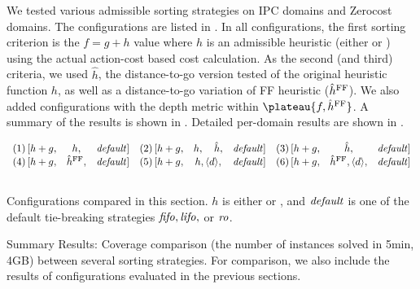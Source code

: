 We tested various admissible sorting strategies on IPC domains and Zerocost domains.
The configurations are listed in . 
In all configurations, the first sorting criterion is the $f=g+h$ value
where $h$ is an admissible heuristic (either \lmcut or \mands) using the actual action-cost based  cost calculation.
As the second (and third) criteria,
we used $\hat{h}$, the distance-to-go version tested  of the original heuristic function $h$, as well as a distance-to-go variation of FF
heuristic ($\hat{h}^{\ff}$).
We also added configurations with the depth metric within
$\plateau{f,\hat{h}^{\text{\ff}}}$.
A summary of the results is shown in .
Detailed per-domain results are shown in .

\begin{table}[htbp]
 \centering
 \[
 \begin{array}{lcllcllcl}
  (1)\, [h+g, & h,                      &\mit{default}] & %
  (2)\, [h+g, & h,     \quad   \hat{h}, &\mit{default}] & %
  (3)\, [h+g, & \hat{h},                &\mit{default}]     \\\relax
  (4)\, [h+g, & \hat{h}^{\ff},          &\mit{default}] & %
  (5)\, [h+g,   & h, \depth,                   &\mit{default}] & %
  (6)\, [h+g,   & \hat{h}^{\text{FF}}, \depth, &\mit{default}]     \\\relax
 \end{array}
 \]
 \vspace{-3em}
 \caption{Configurations compared in this section. $h$ is
 either \lmcut or \mands, and $\mit{default}$ is one of the default
 tie-breaking strategies $\fifo,\lifo,$ or $\ro$. }
 \label{list:distance-configs}
\end{table}

\begin{table}[htbp]
 \centering
 
 \caption{
 Summary Results: Coverage comparison (the number
 of instances solved in 5min, 4GB) between several sorting strategies.
 For comparison, we also include the results of configurations evaluated in the previous sections.
 }
 \label{tbl:dtg-summary}
\end{table}


